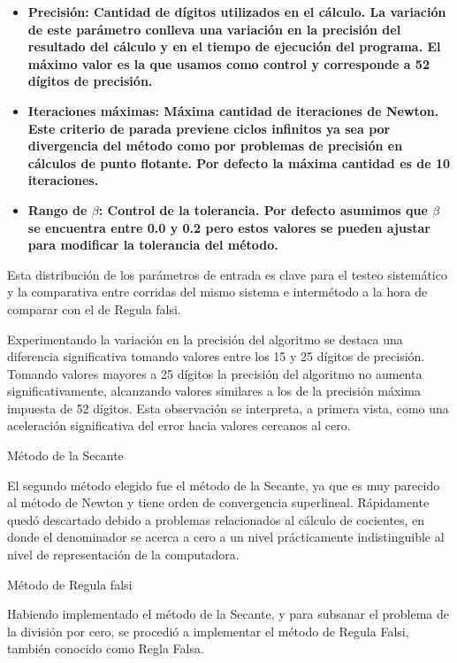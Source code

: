 \begin{itemize}
  \item \bf{Precisi\'on}: Cantidad de d\'igitos utilizados en el c\'alculo. La variaci\'on de este par\'ametro conlleva una variaci\'on en la precisi\'on del resultado del c\'alculo y en el tiempo de ejecuci\'on del programa. El m\'aximo valor es la que usamos como control y corresponde a 52 d\'igitos de precisi\'on.

  \item \bf{Iteraciones m\'aximas}: M\'axima cantidad de iteraciones de Newton. Este criterio de parada previene ciclos infinitos ya sea por divergencia del m\'etodo como por problemas de precisi\'on en c\'alculos de punto flotante. Por defecto la m\'axima cantidad es de 10 iteraciones.

  \item \bf{Rango de $\beta$}: Control de la tolerancia. Por defecto asumimos que $\beta$ se encuentra entre 0.0 y 0.2 pero estos valores se pueden ajustar para modificar la tolerancia del m\'etodo.
\end{itemize}

Esta distribuci\'on de los par\'ametros de entrada es clave para el testeo sistem\'atico y la comparativa entre corridas del mismo sistema e interm\'etodo a la hora de comparar con el de Regula falsi.

Experimentando la variaci\'on en la precisi\'on del algoritmo se destaca una diferencia significativa tomando valores entre los 15 y 25 d\'igitos de precisi\'on. Tomando valores mayores a 25 d\'igitos la precisi\'on del algoritmo no aumenta significativamente, alcanzando valores similares a los de la precisi\'on m\'axima impuesta de 52 d\'igitos. Esta observaci\'on se interpreta, a primera vista, como una aceleraci\'on significativa del error hacia valores cercanos al cero. 

\large{M\'etodo de la Secante}

El segundo m\'etodo elegido fue el m\'etodo de la Secante, ya que es muy parecido al m\'etodo de Newton y tiene orden de convergencia superlineal. R\'apidamente qued\'o descartado debido a problemas relacionados al c\'alculo de cocientes, en donde el denominador se acerca a cero a un nivel pr\'acticamente indistinguible al nivel de representaci\'on de la computadora.

\large{M\'etodo de Regula falsi}

Habiendo implementado el m\'etodo de la Secante, y para subsanar el problema de la divisi\'on por cero, se procedi\'o a implementar el m\'etodo de Regula Falsi, tambi\'en conocido como Regla Falsa.


